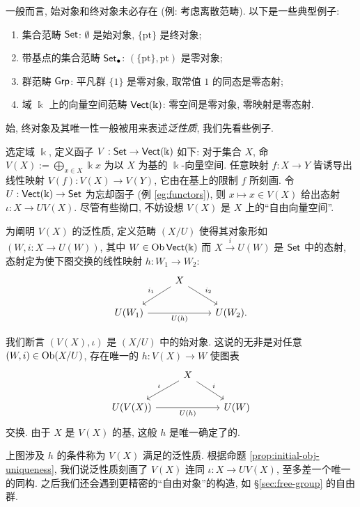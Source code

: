 \begin{example}
	一般而言, 始对象和终对象未必存在 (例: 考虑离散范畴). 以下是一些典型例子:
	\begin{enumerate}
		\item 集合范畴 $\mathsf{Set}$: $\emptyset$ 是始对象, $\{\text{pt}\}$ 是终对象;
		\item 带基点的集合范畴 $\mathsf{Set}_\bullet$: $(\{\text{pt}\}, \text{pt})$ 是零对象;
		\item 群范畴 $\mathsf{Grp}$: 平凡群 $\{1\}$ 是零对象, 取常值 $1$ 的同态是零态射;
		\item 域 $\Bbbk$ 上的向量空间范畴 $\mathsf{Vect}(\Bbbk)$: 零空间是零对象, 零映射是零态射.
	\end{enumerate}
\end{example}

始, 终对象及其唯一性一般被用来表述\emph{泛性质}, 我们先看些例子.
\begin{example}\label{eg:free-vectorspace}
	选定域 $\Bbbk$, 定义函子 $V: \mathsf{Set} \to \mathsf{Vect}(\Bbbk)$ 如下: 对于集合 $X$, 命 $V(X) := \bigoplus_{x \in X} \Bbbk x$ 为以 $X$ 为基的 $\Bbbk$-向量空间. 任意映射 $f: X \to Y$ 皆诱导出线性映射 $V(f): V(X) \to V(Y)$, 它由在基上的限制 $f$ 所刻画. 令 $U: \mathsf{Vect}(\Bbbk) \to \mathsf{Set}$ 为忘却函子 (例 \ref{eg:functors}), 则 $x \mapsto x \in V(X)$ 给出态射 $\iota: X \to UV(X)$. 尽管有些拗口, 不妨设想 $V(X)$ 是 $X$ 上的``自由向量空间''.

	为阐明 $V(X)$ 的泛性质, 定义范畴 $(X / U)$ 使得其对象形如 $(W, i: X \to U(W))$, 其中 $W \in \operatorname{Ob} \mathsf{Vect}(\Bbbk)$ 而 $X \xrightarrow{i} U(W)$ 是 $\mathsf{Set}$ 中的态射, 态射定为使下图交换的线性映射 $h: W_1 \to W_2$:
	\[ \begin{tikzcd}
		{} & X \arrow[ld, "i_1"'] \arrow[rd, "i_2"] & \\
		U(W_1) \arrow[rr, "U(h)"'] & & U(W_2).
  \end{tikzcd} \]

	我们断言 $(V(X), \iota)$ 是 $(X / U)$ 中的始对象. 这说的无非是对任意 $(W, i) \in \operatorname{Ob}(X / U)$, 存在唯一的 $h: V(X) \to W$ 使图表
	\[\begin{tikzcd}
		{} & X \arrow[ld, "\iota"'] \arrow[rd, "i"] & \\
		U(V(X)) \arrow[rr, "U(h)"'] & & U(W)
	\end{tikzcd}\]
	交换. 由于 $X$ 是 $V(X)$ 的基, 这般 $h$ 是唯一确定了的.

	上图涉及 $h$ 的条件称为 $V(X)$ 满足的泛性质. 根据命题 \ref{prop:initial-obj-uniqueness}, 我们说泛性质刻画了 $V(X)$ 连同 $\iota: X \to UV(X)$, 至多差一个唯一的同构. 之后我们还会遇到更精密的``自由对象''的构造, 如 \S\ref{sec:free-group} 的自由群.
\end{example}

